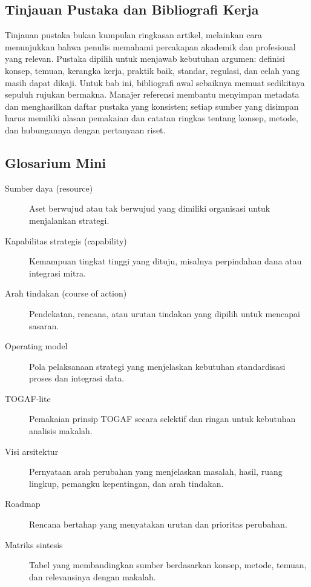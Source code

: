 \subsection{Tinjauan Pustaka dan Bibliografi Kerja}

Tinjauan pustaka bukan kumpulan ringkasan artikel, melainkan cara menunjukkan
bahwa penulis memahami percakapan akademik dan profesional yang relevan. Pustaka
dipilih untuk menjawab kebutuhan argumen: definisi konsep, temuan, kerangka
kerja, praktik baik, standar, regulasi, dan celah yang masih dapat dikaji. Untuk
bab ini, bibliografi awal sebaiknya memuat sedikitnya sepuluh rujukan bermakna.
Manajer referensi membantu menyimpan metadata dan menghasilkan daftar pustaka
yang konsisten; setiap sumber yang disimpan harus memiliki alasan pemakaian dan
catatan ringkas tentang konsep, metode, dan hubungannya dengan pertanyaan riset.

\subsection*{Glosarium Mini}

\begin{description}
  \item[Sumber daya (resource)] Aset berwujud atau tak berwujud yang dimiliki
        organisasi untuk menjalankan strategi.
  \item[Kapabilitas strategis (capability)] Kemampuan tingkat tinggi yang
        dituju, misalnya perpindahan dana atau integrasi mitra.
  \item[Arah tindakan (course of action)] Pendekatan, rencana, atau urutan
        tindakan yang dipilih untuk mencapai sasaran.
  \item[Operating model] Pola pelaksanaan strategi yang menjelaskan kebutuhan
        standardisasi proses dan integrasi data.
  \item[TOGAF-lite] Pemakaian prinsip TOGAF secara selektif dan ringan untuk
        kebutuhan analisis makalah.
  \item[Visi arsitektur] Pernyataan arah perubahan yang menjelaskan masalah,
        hasil, ruang lingkup, pemangku kepentingan, dan arah tindakan.
  \item[Roadmap] Rencana bertahap yang menyatakan urutan dan prioritas
        perubahan.
  \item[Matriks sintesis] Tabel yang membandingkan sumber berdasarkan konsep,
        metode, temuan, dan relevansinya dengan makalah.
\end{description}

